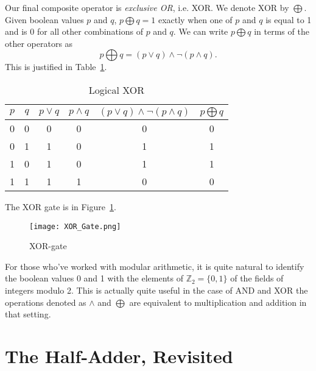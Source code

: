 Our final composite operator is \emph{exclusive OR}, i.e. XOR.  We denote XOR by $\bigoplus$.  Given boolean values $p$ and $q$, $p\bigoplus q = 1$ exactly when one of $p$ and $q$ is equal to 1 and is 0 for all other combinations of $p$ and $q$.  We can write $p\bigoplus q$ in terms of the other operators as
\[
p\bigoplus q = (p\vee q)\wedge \neg(p\wedge q).
\]
This is justified in Table~\ref{table:logical_xor}.
\begin{table}
			\begin{center}
			\begin{tabular}{cccccc}
				$p$ & $q$ & $p\vee q$ & $p\wedge q$ & $(p\vee q)\wedge \neg (p\wedge q)$ & $p\bigoplus q$  \\ \hline
				0  &   0   &    0          &        0        & 0   &  0         \\
				0  &   1   &    1          &        0        & 1   &  1         \\
				1  &   0   &    1          &        0        & 1   &  1         \\
				1  &   1   &    1          &        1        & 0   &  0         \\
			\end{tabular}
			\end{center}\caption{Logical XOR}\label{table:logical_xor}
\end{table}
The XOR gate is in Figure~\ref{figure:xor_gate}.
\begin{figure}
	\begin{center}
	\texttt{[image: XOR\_Gate.png]}
	\end{center}\caption{XOR-gate}\label{figure:xor_gate}
\end{figure}

For those who've worked with modular arithmetic, it is quite natural to identify the boolean values 0 and 1 with the elements of $\mathbb{Z}_2 = \{0, 1\}$ of the fields of integers modulo 2.  This is actually quite useful in the case of AND and XOR the operations denoted as $\wedge$ and $\bigoplus$ are equivalent to multiplication and addition in that setting.

\section{The Half-Adder, Revisited}

